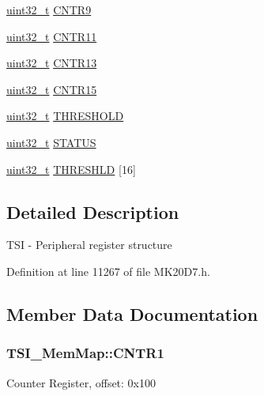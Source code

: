 \begin{DoxyCompactItemize}
\item 
\hyperlink{_p_e___types_8h_a33594304e786b158f3fb30289278f5af}{uint32\+\_\+t} \hyperlink{struct_t_s_i___mem_map_a1792ec66ee609674ea272871f5abcf1c}{C\+N\+T\+R9}
\item 
\hyperlink{_p_e___types_8h_a33594304e786b158f3fb30289278f5af}{uint32\+\_\+t} \hyperlink{struct_t_s_i___mem_map_a73d4134257f7351180c72870359b2bbf}{C\+N\+T\+R11}
\item 
\hyperlink{_p_e___types_8h_a33594304e786b158f3fb30289278f5af}{uint32\+\_\+t} \hyperlink{struct_t_s_i___mem_map_aa09add648d77175d86d87c2d3533af74}{C\+N\+T\+R13}
\item 
\hyperlink{_p_e___types_8h_a33594304e786b158f3fb30289278f5af}{uint32\+\_\+t} \hyperlink{struct_t_s_i___mem_map_aada5f006d1b63bfb573ec56cdf21e4bc}{C\+N\+T\+R15}
\item 
\hyperlink{_p_e___types_8h_a33594304e786b158f3fb30289278f5af}{uint32\+\_\+t} \hyperlink{struct_t_s_i___mem_map_a716863c50b790ef08399633c624ad313}{T\+H\+R\+E\+S\+H\+O\+LD}
\item 
\hyperlink{_p_e___types_8h_a33594304e786b158f3fb30289278f5af}{uint32\+\_\+t} \hyperlink{struct_t_s_i___mem_map_a2e515588d62f40e0b2950b266b739ffd}{S\+T\+A\+T\+US}
\item 
\hyperlink{_p_e___types_8h_a33594304e786b158f3fb30289278f5af}{uint32\+\_\+t} \hyperlink{struct_t_s_i___mem_map_ab227f17724905939b287656009e50f03}{T\+H\+R\+E\+S\+H\+LD} \mbox{[}16\mbox{]}
\end{DoxyCompactItemize}


\subsection{Detailed Description}
T\+SI -\/ Peripheral register structure 

Definition at line 11267 of file M\+K20\+D7.\+h.



\subsection{Member Data Documentation}
\subsubsection[{\texorpdfstring{C\+N\+T\+R1}{CNTR1}}]{ T\+S\+I\+\_\+\+Mem\+Map\+::\+C\+N\+T\+R1}\hypertarget{struct_t_s_i___mem_map_a04fc03ca20b588fb20be9eee512fbfeb}{}\label{struct_t_s_i___mem_map_a04fc03ca20b588fb20be9eee512fbfeb}
Counter Register, offset\+: 0x100 

